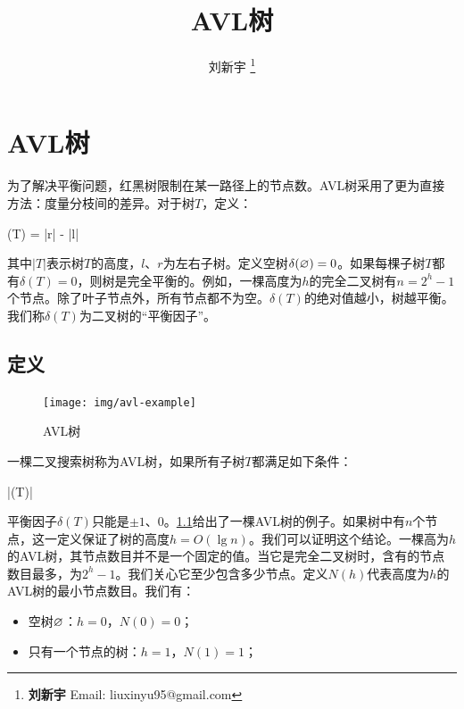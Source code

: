\documentclass[b5paper]{ctexart}
\begin{document}
\title{AVL树}

\author{刘新宇
\thanks{{\bfseries 刘新宇} \newline
  Email: liuxinyu95@gmail.com \newline}
  }

\maketitle
\fi


\ifx\wholebook\relax
\chapter{AVL树}
\fi

\label{introduction} 

为了解决平衡问题，红黑树限制在某一路径上的节点数。AVL树采用了更为直接方法：度量分枝间的差异。对于树$T$，定义：

\be
  \delta(T) = |r| - |l|
\ee

其中$|T|$表示树$T$的高度，$l$、$r$为左右子树。定义空树$\delta(\varnothing) = 0$。如果每棵子树$T$都有$\delta(T) = 0$，则树是完全平衡的。例如，一棵高度为$h$的完全二叉树有$n = 2^h - 1$个节点。除了叶子节点外，所有节点都不为空。$\delta(T)$的绝对值越小，树越平衡。我们称$\delta(T)$为二叉树的“平衡因子”。

\section{定义}

\begin{figure}[htbp]
   \centering
   \texttt{[image: img/avl-example]}
   \caption{AVL树} \label{fig:avl-example}
\end{figure}

一棵二叉搜索树称为AVL树，如果所有子树$T$都满足如下条件：

\be
  |\delta(T)| 
  \label{eq:avl-rule}
\ee

平衡因子$\delta(T)$只能是$\pm 1$、0。\cref{fig:avl-example}给出了一棵AVL树的例子。如果树中有$n$个节点，这一定义保证了树的高度$h = O(\lg n)$。我们可以证明这个结论。一棵高为$h$的AVL树，其节点数目并不是一个固定的值。当它是完全二叉树时，含有的节点数目最多，为$2^h - 1$。我们关心它至少包含多少节点。定义$N(h)$代表高度为$h$的AVL树的最小节点数目。我们有：

\begin{itemize}
\item 空树$\varnothing$：$h = 0$，$N(0) = 0$；
\item 只有一个节点的树：$h = 1$，$N(1) = 1$；
\end{itemize}
\end{document}
